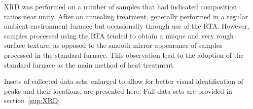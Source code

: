 XRD was performed on a number of samples that had indicated composition ratios near unity. After an annealing treatment, generally performed in a regular ambient environment furnace but occasionally through use of the RTA. However, samples processed using the RTA tended to obtain a unique and very rough surface texture, as opposed to the smooth mirror appearance of samples processed in the standard furnace. This observation lead to the adoption of the standard furnace as the main method of heat treatment. 


Insets of collected data sets, enlarged to allow for better visual identification of peaks and their locations, are presented here. Full data sets are provided in section~\vref{sup:XRD}. 



\begin{figure}[htbp]
	 \hspace{0.5cm}
\end{figure}



















